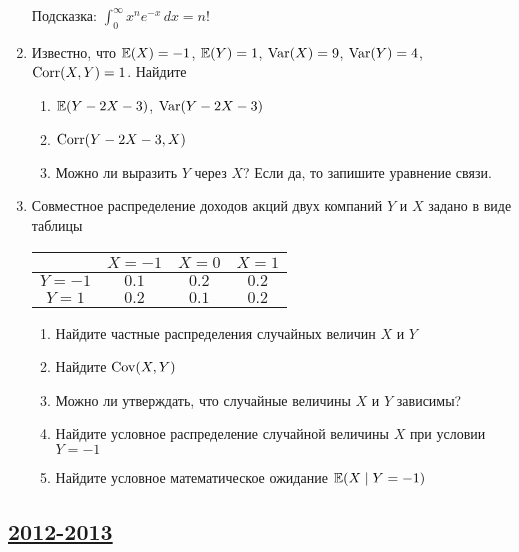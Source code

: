 \begin{enumerate}
Подсказка: $\int_0^{\infty} x^n e^{-x} \, dx=n!$

\item Известно, что  $\operatorname{\mathbb{E}}(X)=-1$, $\operatorname{\mathbb{E}}(Y)=1$, $\operatorname{Var}(X)=9$, $\operatorname{Var}(Y)=4$, $\operatorname{Corr}(X,Y)=1$.
Найдите
\begin{enumerate}
\item $\operatorname{\mathbb{E}}(Y-2X-3)$, $\operatorname{Var}(Y-2X-3)$
\item  $\operatorname{Corr}(Y-2X-3,X)$
\item Можно ли выразить $Y$ через $X$? Если да, то запишите уравнение связи.
\end{enumerate}

\item Совместное распределение доходов акций двух компаний $Y$ и $X$ задано в виде таблицы

\begin{center}
\begin{tabular}{@{}cccc@{}}
\toprule
    & $X=-1$ & $X=0$ & $X=1$ \\ \midrule
$Y=-1$ & $0.1$  & $0.2$   & $0.2$ \\
$Y=1$ & $0.2$  & $0.1$ & $0.2$ \\ \bottomrule
\end{tabular}
\end{center}

\begin{enumerate}
\item Найдите  частные распределения случайных величин $X$ и $Y$
\item Найдите $\operatorname{Cov}(X,Y)$
\item Можно ли утверждать, что случайные величины $X$ и $Y$ зависимы?
\item Найдите условное распределение случайной величины $X$ при условии $Y=-1$
\item Найдите условное математическое ожидание $\operatorname{\mathbb{E}}(X\mid Y=-1)$
\end{enumerate}
\end{enumerate}



\newpage
\subsection[2012-2013]{\hyperref[sec:sol_kr_01_2012_2013]{2012-2013}}
\label{sec:kr_01_2012_2013}



